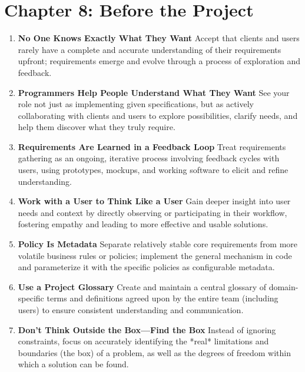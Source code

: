 \documentclass[11pt]{article}
\begin{document}
\section*{Chapter 8: Before the Project}
\begin{enumerate}[label=\arabic*., start=75, itemsep=1ex]
    \item \textbf{No One Knows Exactly What They Want}
    Accept that clients and users rarely have a complete and accurate understanding of their requirements upfront; requirements emerge and evolve through a process of exploration and feedback.

    \item \textbf{Programmers Help People Understand What They Want}
    See your role not just as implementing given specifications, but as actively collaborating with clients and users to explore possibilities, clarify needs, and help them discover what they truly require.

    \item \textbf{Requirements Are Learned in a Feedback Loop}
    Treat requirements gathering as an ongoing, iterative process involving feedback cycles with users, using prototypes, mockups, and working software to elicit and refine understanding.

    \item \textbf{Work with a User to Think Like a User}
    Gain deeper insight into user needs and context by directly observing or participating in their workflow, fostering empathy and leading to more effective and usable solutions.

    \item \textbf{Policy Is Metadata}
    Separate relatively stable core requirements from more volatile business rules or policies; implement the general mechanism in code and parameterize it with the specific policies as configurable metadata.

    \item \textbf{Use a Project Glossary}
    Create and maintain a central glossary of domain-specific terms and definitions agreed upon by the entire team (including users) to ensure consistent understanding and communication.

    \item \textbf{Don't Think Outside the Box—Find the Box}
    Instead of ignoring constraints, focus on accurately identifying the *real* limitations and boundaries (the box) of a problem, as well as the degrees of freedom within which a solution can be found.
\end{enumerate}
\end{document}
